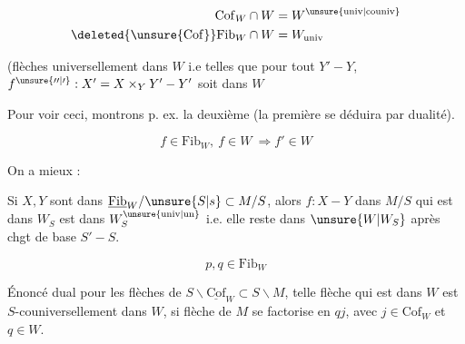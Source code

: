 
\[ \begin{aligned}\mathrm{Cof}_W\cap W&=W^{\unsure{\mathrm{univ}|\mathrm{couniv}}}\\ \deleted{\unsure{\mathrm{Cof}}}\mathrm{Fib}_W\cap W&=W_{\mathrm{univ}}\end{aligned} \]

(flèches  universellement dans $W$ i.e telles que pour tout $Y'-Y$, $f^{\unsure{\prime\prime|\prime}}:X'=X\times_Y Y'-Y'$ soit dans $W$

Pour voir ceci, montrons p. ex. la deuxième (la première  se déduira par dualité).


\[ f\in\mathrm{Fib}_W,\ f\in W\ \Longrightarrow f'\in W \]

On a mieux :

\uline{} \uline{}

 Si $X,Y$ sont dans $\underline{\mathrm{Fib}}_W/\unsure{S|s}\subset M/S$, alors  $f:X-Y$ dans $M/S$ qui est dans $W_S$ est dans $W_S^{\unsure{\mathrm{univ}|\mathrm{un}}}$ i.e. elle reste dans $\unsure{W|W_S}$ après  chgt de base $S'-S$.


\[ p,q\in\mathrm{Fib}_W \]

Énoncé dual pour les flèches de $S\backslash\underline{\mathrm{Cof}}_W\subset S\backslash M$,  telle flèche qui est dans $W$ est $S$-couniversellement dans $W$, si  flèche de $M$ se factorise en $qj$, avec $j\in\mathrm{Cof}_W$ et $q\in W$.



